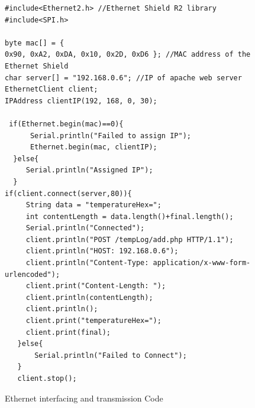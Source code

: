 \begin{figure}[H]
\begin{lstlisting}[style=Arduino]
#include<Ethernet2.h> //Ethernet Shield R2 library
#include<SPI.h>

byte mac[] = {
0x90, 0xA2, 0xDA, 0x10, 0x2D, 0xD6 }; //MAC address of the Ethernet Shield
char server[] = "192.168.0.6"; //IP of apache web server
EthernetClient client;
IPAddress clientIP(192, 168, 0, 30);

 if(Ethernet.begin(mac)==0){
      Serial.println("Failed to assign IP");
      Ethernet.begin(mac, clientIP);
  }else{
     Serial.println("Assigned IP");
  }
if(client.connect(server,80)){
     String data = "temperatureHex=";
     int contentLength = data.length()+final.length();
     Serial.println("Connected");   
     client.println("POST /tempLog/add.php HTTP/1.1"); 
     client.println("HOST: 192.168.0.6"); 
     client.println("Content-Type: application/x-www-form-urlencoded");
     client.print("Content-Length: ");
     client.println(contentLength);
     client.println();
     client.print("temperatureHex=");
     client.print(final);
   }else{
       Serial.println("Failed to Connect");
   }
   client.stop();
\end{lstlisting}
\caption{Ethernet interfacing and transmission Code }
\label{snip:ethernet}
\end{figure}

